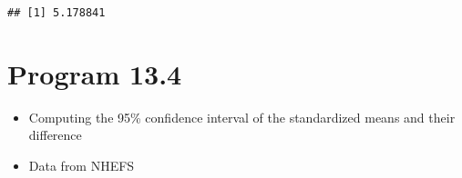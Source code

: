 \documentclass[10pt,]{book}
\newenvironment{Shaded}{\begin{snugshade}}{\end{snugshade}}
\newcommand{\DecValTok}[1]{\textcolor[rgb]{0.00,0.00,0.81}{#1}}
\newcommand{\KeywordTok}[1]{\textcolor[rgb]{0.13,0.29,0.53}{\textbf{#1}}}
\newcommand{\NormalTok}[1]{#1}
\newcommand{\OperatorTok}[1]{\textcolor[rgb]{0.81,0.36,0.00}{\textbf{#1}}}
\newcommand{\StringTok}[1]{\textcolor[rgb]{0.31,0.60,0.02}{#1}}
\providecommand{\tightlist}{%
  \setlength{\itemsep}{0pt}\setlength{\parskip}{0pt}}
\begin{document}
\begin{Shaded}
\end{Shaded}

\begin{verbatim}
## [1] 5.178841
\end{verbatim}

\hypertarget{program-13.4}{%
\section{Program 13.4}\label{program-13.4}}

\begin{itemize}
\tightlist
\item
  Computing the 95\% confidence interval of the standardized means and their difference
\item
  Data from NHEFS
\end{itemize}
\end{document}
